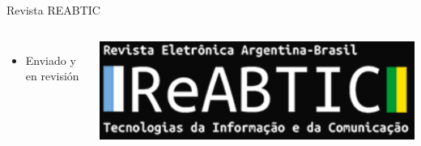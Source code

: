 \begin{frame}
\begin{block}{\small Revista REABTIC}
\begin{columns}
\begin{itemize}
                \item
                Enviado y en revisión
            \end{itemize}

            \begin{center}
                \includegraphics[width=\textwidth]{images/logo-reabtic.png}
            \end{center}
        \end{columns}
    \end{block}
\end{frame}
